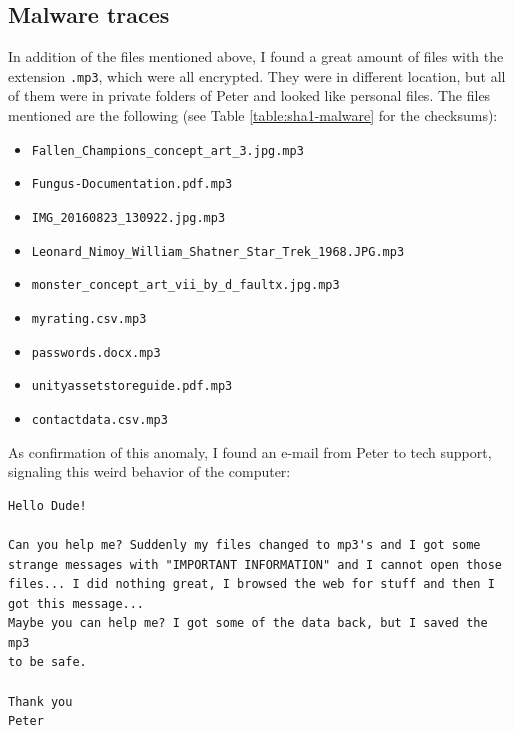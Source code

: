 \documentclass[12pt]{article}
\begin{document}
\subsection{Malware traces}

In addition of the files mentioned above, I found a great amount of files with the extension \texttt{.mp3}, which were all encrypted. They were in different location, but all of them were in private folders of Peter and looked like personal files.
The files mentioned are the following (see Table \ref{table:sha1-malware} for the checksums):
\begin{itemize} 
    \itemsep-0.5em 
    \item \texttt{Fallen\_Champions\_concept\_art\_3.jpg.mp3}
    \item \texttt{Fungus-Documentation.pdf.mp3}
    \item \texttt{IMG\_20160823\_130922.jpg.mp3}
    \item \texttt{Leonard\_Nimoy\_William\_Shatner\_Star\_Trek\_1968.JPG.mp3}
    \item \texttt{monster\_concept\_art\_vii\_by\_d\_faultx.jpg.mp3}
    \item \texttt{myrating.csv.mp3}
    \item \texttt{passwords.docx.mp3}
    \item \texttt{unityassetstoreguide.pdf.mp3}
    \item \texttt{contactdata.csv.mp3}
\end{itemize}

As confirmation of this anomaly, I found an e-mail from Peter to tech support, signaling this weird behavior of the computer:

\begin{shaded}
\begin{verbatim}
Hello Dude!

Can you help me? Suddenly my files changed to mp3's and I got some
strange messages with "IMPORTANT INFORMATION" and I cannot open those
files... I did nothing great, I browsed the web for stuff and then I
got this message...
Maybe you can help me? I got some of the data back, but I saved the mp3
to be safe.

Thank you
Peter
\end{verbatim}
\end{shaded}
\end{document}
